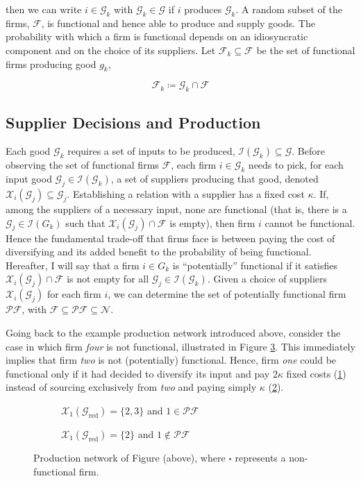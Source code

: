 \documentclass[american, abstract=on]{scrartcl}
\newcommand{\inputTikZ}[2]{%
      \scalebox{#1}{}  
    }
\newcommand{\F}{\mathcal{F}}
\newcommand{\X}{\mathcal{X}}
\newcommand{\G}{\mathcal{G}}
\newcommand{\I}{\mathcal{I}}
\newcommand{\N}{\mathcal{N}}
\newcommand{\PF}{\mathcal{P} \F}
\begin{document}
then we can write $i \in \G_k$ with $\G_k \in \G$ if $i$ produces $\G_k$. A random subset of the firms, $\F$, is functional and hence able to produce and supply goods. The probability with which a firm is functional depends on an idiosyncratic component and on the choice of its suppliers. Let $\F_k \subseteq \F$ be the set of functional firms producing good $g_k$,

\begin{equation}
  \F_k \coloneqq \G_k \cap \F
\end{equation}

\subsection{Supplier Decisions and Production}

Each good $\G_k$ requires a set of inputs to be produced, $\mathcal{I}(\G_k) \subseteq \G$. Before observing the set of functional firms $\F$, each firm $i \in \G_k$ needs to pick, for each input good $\G_j \in \mathcal{I}(\G_k)$, a set of suppliers producing that good, denoted $\X_i(\G_j) \subseteq \G_j$. Establishing a relation with a supplier has a fixed cost $\kappa$. If, among the suppliers of a necessary input, none are functional (that is, there is a $\G_j \in \I(G_k)$ such that $\X_i(\G_j) \cap \F$ is empty), then firm $i$ cannot be functional. Hence the fundamental trade-off that firms face is between paying the cost of diversifying and its added benefit to the probability of being functional. Hereafter, I will say that a firm $i \in G_k$ is ``potentially'' functional if it satisfies $\X_i(\G_j) \cap \F$ is not empty for all $\G_j \in \I(\G_k)$. Given a choice of suppliers $\X_i(\G_j)$ for each firm $i$, we can determine the set of potentially functional firm $\PF$, with $\F \subseteq \PF \subseteq \N$.

Going back to the example production network introduced above, consider the case in which firm \textit{four} is not functional, illustrated in Figure \ref{fig:functional_example}. This immediately implies that firm \textit{two} is not (potentially) functional. Hence, firm \textit{one} could be functional only if it had decided to diversify its input and pay $2\kappa$ fixed costs (\ref{fig:functional_example:yes}) instead of sourcing exclusively from \textit{two} and paying simply $\kappa$ (\ref{fig:functional_example:no}).

\begin{figure}[H]
  \centering
  \begin{subfigure}{.5\textwidth}
    \centering
    \inputTikZ{0.5}{diagrams/example-functional.tikz} 
    \caption{$\X_1(\G_{\text{red}}) = \{2, 3\}$ and $1 \in \PF$}
    \label{fig:functional_example:yes}  
  \end{subfigure}%
  \begin{subfigure}{.5\textwidth}
    \centering
    \inputTikZ{0.5}{diagrams/example-notfunctional.tikz} 
    \caption{$\X_1(\G_{\text{red}}) = \{2\}$ and $1 \notin \PF$}
    \label{fig:functional_example:no}
  \end{subfigure}
  \caption{Production network of Figure (above), where $\square$ represents a non-functional firm.}
  \label{fig:functional_example}
\end{figure}
\end{document}
